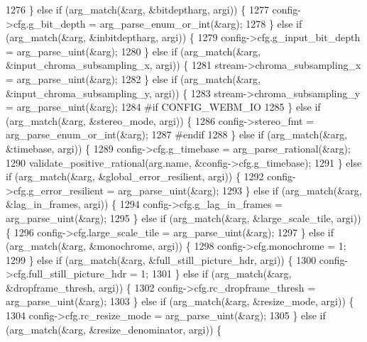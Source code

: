 \begin{DoxyCodeInclude}
{{{{{{{{{{{{{{{{1276     \} \textcolor{keywordflow}{else} \textcolor{keywordflow}{if} (arg\_match(&arg, &bitdeptharg, argi)) \{
1277       config->cfg.g\_bit\_depth = arg\_parse\_enum\_or\_int(&arg);
1278     \} \textcolor{keywordflow}{else} \textcolor{keywordflow}{if} (arg\_match(&arg, &inbitdeptharg, argi)) \{
1279       config->cfg.g\_input\_bit\_depth = arg\_parse\_uint(&arg);
1280     \} \textcolor{keywordflow}{else} \textcolor{keywordflow}{if} (arg\_match(&arg, &input\_chroma\_subsampling\_x, argi)) \{
1281       stream->chroma\_subsampling\_x = arg\_parse\_uint(&arg);
1282     \} \textcolor{keywordflow}{else} \textcolor{keywordflow}{if} (arg\_match(&arg, &input\_chroma\_subsampling\_y, argi)) \{
1283       stream->chroma\_subsampling\_y = arg\_parse\_uint(&arg);
1284 \textcolor{preprocessor}{#if CONFIG\_WEBM\_IO}
1285     \} \textcolor{keywordflow}{else} \textcolor{keywordflow}{if} (arg\_match(&arg, &stereo\_mode, argi)) \{
1286       config->stereo\_fmt = arg\_parse\_enum\_or\_int(&arg);
1287 \textcolor{preprocessor}{#endif}
1288     \} \textcolor{keywordflow}{else} \textcolor{keywordflow}{if} (arg\_match(&arg, &timebase, argi)) \{
1289       config->cfg.g\_timebase = arg\_parse\_rational(&arg);
1290       validate\_positive\_rational(arg.name, &config->cfg.g\_timebase);
1291     \} \textcolor{keywordflow}{else} \textcolor{keywordflow}{if} (arg\_match(&arg, &global\_error\_resilient, argi)) \{
1292       config->cfg.g\_error\_resilient = arg\_parse\_uint(&arg);
1293     \} \textcolor{keywordflow}{else} \textcolor{keywordflow}{if} (arg\_match(&arg, &lag\_in\_frames, argi)) \{
1294       config->cfg.g\_lag\_in\_frames = arg\_parse\_uint(&arg);
1295     \} \textcolor{keywordflow}{else} \textcolor{keywordflow}{if} (arg\_match(&arg, &large\_scale\_tile, argi)) \{
1296       config->cfg.large\_scale\_tile = arg\_parse\_uint(&arg);
1297     \} \textcolor{keywordflow}{else} \textcolor{keywordflow}{if} (arg\_match(&arg, &monochrome, argi)) \{
1298       config->cfg.monochrome = 1;
1299     \} \textcolor{keywordflow}{else} \textcolor{keywordflow}{if} (arg\_match(&arg, &full\_still\_picture\_hdr, argi)) \{
1300       config->cfg.full\_still\_picture\_hdr = 1;
1301     \} \textcolor{keywordflow}{else} \textcolor{keywordflow}{if} (arg\_match(&arg, &dropframe\_thresh, argi)) \{
1302       config->cfg.rc\_dropframe\_thresh = arg\_parse\_uint(&arg);
1303     \} \textcolor{keywordflow}{else} \textcolor{keywordflow}{if} (arg\_match(&arg, &resize\_mode, argi)) \{
1304       config->cfg.rc\_resize\_mode = arg\_parse\_uint(&arg);
1305     \} \textcolor{keywordflow}{else} \textcolor{keywordflow}{if} (arg\_match(&arg, &resize\_denominator, argi)) \{
}}}}}}}}}}}}}}}}
\end{DoxyCodeInclude}
